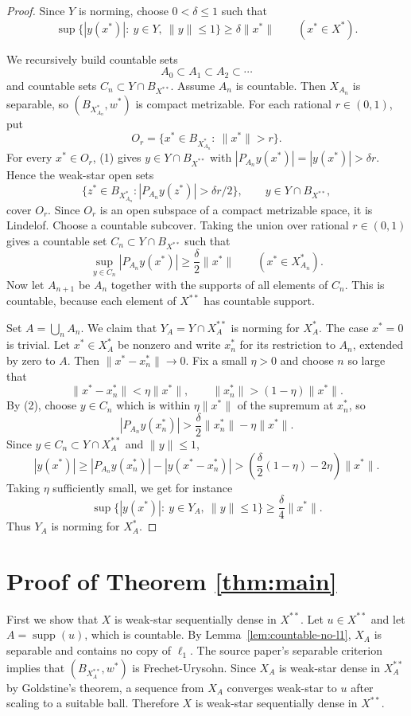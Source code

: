 \documentclass[11pt]{article}
\newcommand{\supp}{\operatorname{supp}}
\newcommand{\Ball}{B}
\begin{document}
\begin{proof}
Since $Y$ is norming, choose $0<\delta\leq 1$ such that
\[
\sup\{|y(x^*)|:\ y\in Y,\ \|y\|\leq 1\}\geq \delta \|x^*\|
\qquad (x^*\in X^*).
\tag{1}
\]

We recursively build countable sets
\[
A_0\subset A_1\subset A_2\subset\cdots
\]
and countable sets $C_n\subset Y\cap \Ball_{X^{**}}$.
Assume $A_n$ is countable.  Then $X_{A_n}$ is separable, so
$(\Ball_{X_{A_n}^*},w^*)$ is compact metrizable.  For each rational
$r\in(0,1)$, put
\[
O_r=\{x^*\in \Ball_{X_{A_n}^*}:\ \|x^*\|>r\}.
\]
For every $x^*\in O_r$, (1) gives $y\in Y\cap\Ball_{X^{**}}$ with
$|P_{A_n}y(x^*)|=|y(x^*)|>\delta r$.  Hence the weak-star open sets
\[
\{z^*\in \Ball_{X_{A_n}^*}: |P_{A_n}y(z^*)|>\delta r/2\},
\qquad y\in Y\cap\Ball_{X^{**}},
\]
cover $O_r$.  Since $O_r$ is an open subspace of a compact metrizable space,
it is Lindelof.  Choose a countable subcover.  Taking the union over rational
$r\in(0,1)$ gives a countable set $C_n\subset Y\cap\Ball_{X^{**}}$ such that
\[
\sup_{y\in C_n}|P_{A_n}y(x^*)|\geq \frac{\delta}{2}\|x^*\|
\qquad (x^*\in X_{A_n}^*).
\tag{2}
\]
Now let $A_{n+1}$ be $A_n$ together with the supports of all elements of
$C_n$.  This is countable, because each element of $X^{**}$ has countable
support.

Set $A=\bigcup_n A_n$.  We claim that $Y_A=Y\cap X_A^{**}$ is norming for
$X_A^*$.  The case $x^*=0$ is trivial.  Let $x^*\in X_A^*$ be nonzero and
write $x_n^*$ for its restriction to $A_n$, extended by zero to $A$.  Then
$\|x^*-x_n^*\|\to0$.  Fix a small $\eta>0$ and choose $n$ so large that
\[
\|x^*-x_n^*\|<\eta\|x^*\|,
\qquad
\|x_n^*\|>(1-\eta)\|x^*\|.
\]
By (2), choose $y\in C_n$ which is within $\eta\|x^*\|$ of the supremum at
$x_n^*$, so
\[
|P_{A_n}y(x_n^*)|>
\frac{\delta}{2}\|x_n^*\|-\eta\|x^*\|.
\]
Since $y\in C_n\subset Y\cap X_A^{**}$ and $\|y\|\leq1$,
\[
|y(x^*)|
\geq |P_{A_n}y(x_n^*)|-|y(x^*-x_n^*)|
>
\left(\frac{\delta}{2}(1-\eta)-2\eta\right)\|x^*\|.
\]
Taking $\eta$ sufficiently small, we get for instance
\[
\sup\{|y(x^*)|:\ y\in Y_A,\ \|y\|\leq1\}\geq \frac{\delta}{4}\|x^*\|.
\]
Thus $Y_A$ is norming for $X_A^*$.
\end{proof}

\section*{Proof of Theorem \ref{thm:main}}

First we show that $X$ is weak-star sequentially dense in $X^{**}$.  Let
$u\in X^{**}$ and let $A=\supp(u)$, which is countable.  By
Lemma~\ref{lem:countable-no-l1}, $X_A$ is separable and contains no copy of
$\ell_1$.  The source paper's separable criterion~\cite[Corollary 4.8]{GMR}
implies that $(\Ball_{X_A^{**}},w^*)$ is Frechet-Urysohn.  Since $X_A$ is
weak-star dense in $X_A^{**}$ by Goldstine's theorem, a sequence from $X_A$
converges weak-star to $u$ after scaling to a suitable ball.  Therefore $X$ is
weak-star sequentially dense in $X^{**}$.
\end{document}
